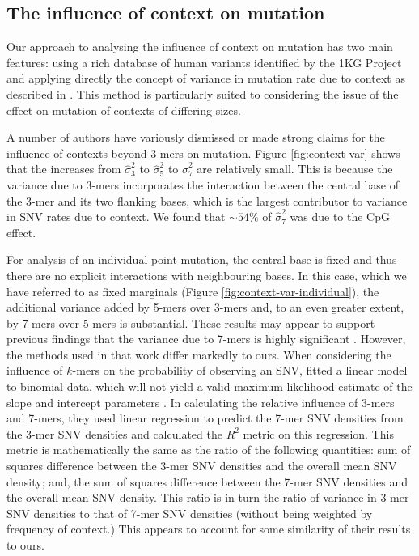 \subsection*{The influence of context on mutation}

Our approach to analysing the influence of context on mutation has two main features: using a rich database of human variants identified by the 1KG Project \citep{Auton2015} and applying directly the concept of variance in mutation rate due to context as described in . This method is particularly suited to considering the issue of the effect on mutation of contexts of differing sizes. 

A number of authors have variously dismissed \citep{Krawczak_1998, Hodgkinson2009} or made strong claims for \citep{Aggarwala2016, Zhu_2016} the influence of contexts beyond 3-mers on mutation. Figure \ref{fig:context-var} shows that the increases from $\hat\sigma^2_3$ to $\hat\sigma^2_5$ to $\hat\sigma^2_7$ are relatively small. This is because the variance due to 3-mers incorporates the interaction between the central base of the 3-mer and its two flanking bases, which is the largest contributor to variance in SNV rates due to context. We found that $\sim54\%$ of $\hat\sigma^2_7$ was due to the CpG effect.

For analysis of an individual point mutation, the central base is fixed and thus there are no explicit interactions with neighbouring bases. In this case, which we have referred to as fixed marginals (Figure \ref{fig:context-var-individual}), the additional variance added by 5-mers over 3-mers and, to an even greater extent, by 7-mers over 5-mers is substantial.  These results may appear to support previous findings that the variance due to 7-mers is highly significant \citep{Aggarwala2016}. However, the methods used in that work differ markedly to ours.  When considering the influence of $k$-mers on the probability of observing an SNV, \citet{Aggarwala2016} fitted a linear model to binomial data, which will not yield a valid maximum likelihood estimate of the slope and intercept parameters \citep[][p. 120]{agresti}. In calculating the relative influence of 3-mers and 7-mers, they used linear regression to predict the 7-mer SNV densities from the 3-mer SNV densities and calculated the $R^2$ metric on this regression. This metric is mathematically the same as the ratio of the following quantities: sum of squares difference between the 3-mer SNV densities and the overall mean SNV density; and, the sum of squares difference between the 7-mer SNV densities and the overall mean SNV density. This ratio is in turn the ratio of variance in 3-mer SNV densities to that of 7-mer SNV densities (without being weighted by frequency of context.) This appears to account for some similarity of their results to ours.

